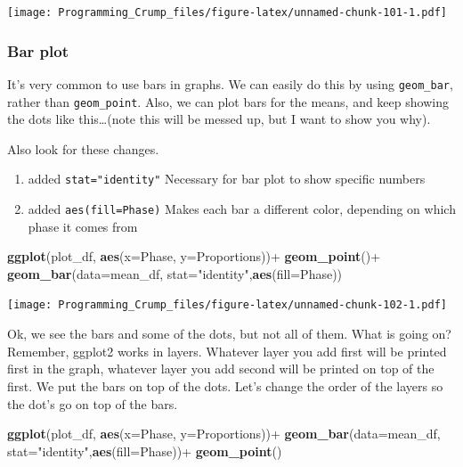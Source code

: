 \documentclass[]{book}
\newenvironment{Shaded}{\begin{snugshade}}{\end{snugshade}}
\newcommand{\KeywordTok}[1]{\textcolor[rgb]{0.13,0.29,0.53}{\textbf{{#1}}}}
\newcommand{\DataTypeTok}[1]{\textcolor[rgb]{0.13,0.29,0.53}{{#1}}}
\newcommand{\StringTok}[1]{\textcolor[rgb]{0.31,0.60,0.02}{{#1}}}
\newcommand{\NormalTok}[1]{{#1}}
\providecommand{\tightlist}{%
  \setlength{\itemsep}{0pt}\setlength{\parskip}{0pt}}
\theoremstyle{definition}
\theoremstyle{definition}
\theoremstyle{definition}
\theoremstyle{remark}
\begin{document}
\texttt{[image: Programming\_Crump\_files/figure-latex/unnamed-chunk-101-1.pdf]}

\subsubsection{Bar plot}\label{bar-plot}

It's very common to use bars in graphs. We can easily do this by using
\texttt{geom\_bar}, rather than \texttt{geom\_point}. Also, we can plot
bars for the means, and keep showing the dots like this\ldots{}(note
this will be messed up, but I want to show you why).

Also look for these changes.

\begin{enumerate}
\def\labelenumi{\arabic{enumi}.}
\tightlist
\item
  added \texttt{stat="identity"} Necessary for bar plot to show specific
  numbers
\item
  added \texttt{aes(fill=Phase)} Makes each bar a different color,
  depending on which phase it comes from
\end{enumerate}

\begin{Shaded}
\begin{Highlighting}[]
\KeywordTok{ggplot}\NormalTok{(plot_df, }\KeywordTok{aes}\NormalTok{(}\DataTypeTok{x=}\NormalTok{Phase, }\DataTypeTok{y=}\NormalTok{Proportions))+}\StringTok{ }
\StringTok{  }\KeywordTok{geom_point}\NormalTok{()+}
\StringTok{  }\KeywordTok{geom_bar}\NormalTok{(}\DataTypeTok{data=}\NormalTok{mean_df, }\DataTypeTok{stat=}\StringTok{"identity"}\NormalTok{,}\KeywordTok{aes}\NormalTok{(}\DataTypeTok{fill=}\NormalTok{Phase))}
\end{Highlighting}
\end{Shaded}

\texttt{[image: Programming\_Crump\_files/figure-latex/unnamed-chunk-102-1.pdf]}

Ok, we see the bars and some of the dots, but not all of them. What is
going on? Remember, ggplot2 works in layers. Whatever layer you add
first will be printed first in the graph, whatever layer you add second
will be printed on top of the first. We put the bars on top of the dots.
Let's change the order of the layers so the dot's go on top of the bars.

\begin{Shaded}
\begin{Highlighting}[]
\KeywordTok{ggplot}\NormalTok{(plot_df, }\KeywordTok{aes}\NormalTok{(}\DataTypeTok{x=}\NormalTok{Phase, }\DataTypeTok{y=}\NormalTok{Proportions))+}\StringTok{ }
\StringTok{  }\KeywordTok{geom_bar}\NormalTok{(}\DataTypeTok{data=}\NormalTok{mean_df, }\DataTypeTok{stat=}\StringTok{"identity"}\NormalTok{,}\KeywordTok{aes}\NormalTok{(}\DataTypeTok{fill=}\NormalTok{Phase))+}
\StringTok{  }\KeywordTok{geom_point}\NormalTok{()}
\end{Highlighting}
\end{Shaded}
\end{document}
